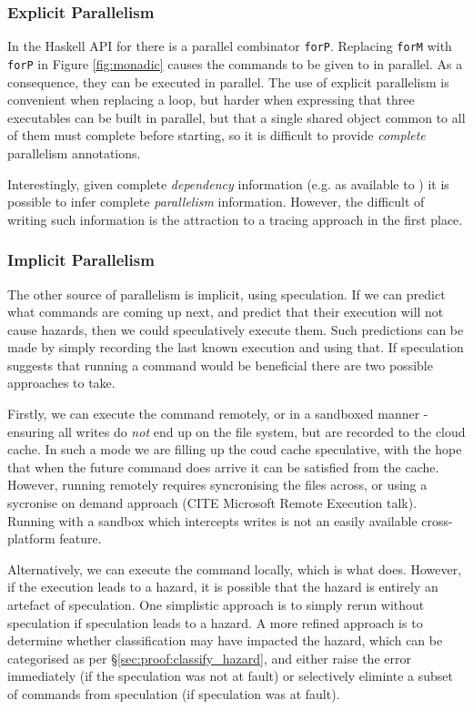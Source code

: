 \subsubsection{Explicit Parallelism}

In the Haskell API for \Rattle there is a parallel combinator \texttt{forP}. Replacing \texttt{forM} with \texttt{forP} in Figure \ref{fig:monadic} causes the commands to be given to \Rattle in parallel. As a consequence, they can be executed in parallel. The use of explicit parallelism is convenient when replacing a loop, but harder when expressing that three executables can be built in parallel, but that a single shared object common to all of them must complete before starting, so it is difficult to provide \emph{complete} parallelism annotations.

Interestingly, given complete \emph{dependency} information (e.g. as available to \Make) it is possible to infer complete \emph{parallelism} information. However, the difficult of writing such information is the attraction to a tracing approach in the first place.

\subsubsection{Implicit Parallelism}

The other source of parallelism is implicit, using speculation. If we can predict what commands are coming up next, and predict that their execution will not cause hazards, then we could speculatively execute them. Such predictions can be made by simply recording the last known execution and using that. If speculation suggests that running a command would be beneficial there are two possible approaches to take.

Firstly, we can execute the command remotely, or in a sandboxed manner - ensuring all writes do \emph{not} end up on the file system, but are recorded to the cloud cache. In such a mode we are filling up the coud cache speculative, with the hope that when the future command does arrive it can be satisfied from the cache. However, running remotely requires syncronising the files across, or using a sycronise on demand approach (CITE Microsoft Remote Execution talk). Running with a sandbox which intercepts writes is not an easily available cross-platform feature.

Alternatively, we can execute the command locally, which is what \Rattle does. However, if the execution leads to a hazard, it is possible that the hazard is entirely an artefact of speculation. One simplistic approach is to simply rerun without speculation if speculation leads to a hazard. A more refined approach is to determine whether classification may have impacted the hazard, which can be categorised as per \S\ref{sec:proof:classify_hazard}, and either raise the error immediately (if the speculation was not at fault) or selectively eliminte a subset of commands from speculation (if speculation was at fault).
